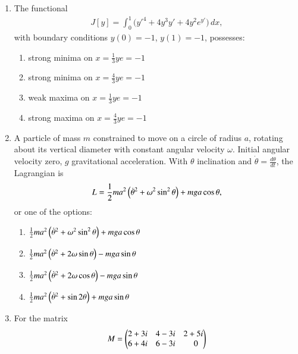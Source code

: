 \documentclass[journal]{IEEEtran}
\numberwithin{equation}{enumi}
\numberwithin{figure}{enumi}
\begin{document}
\begin{enumerate}
\item
The functional
\begin{align}
J[y] = \int_0^1 \Big( y'^4 + 4 y^3 y' + 4 y^2 e^{y'} \Big) \, dx,
\end{align}
with boundary conditions $y(0) = -1$, $y(1) = -1$, possesses:
\hfill{}
\begin{multicols}{2}
\begin{enumerate}
\item strong minima on $x = \frac{1}{3} y e = -1$
\item strong minima on $x = \frac{4}{3} y e = -1$
\item weak maxima on $x = \frac{1}{3} y e = -1$
\item strong maxima on $x = \frac{4}{3} y e = -1$
\end{enumerate}
\end{multicols}

\item
A particle of mass $m$ constrained to move on a circle of radius $a$, rotating about its vertical diameter with constant angular velocity $\omega$. Initial angular velocity zero, $g$ gravitational acceleration. With $\theta$ inclination and $\dot{\theta} = \frac{d\theta}{dt}$, the Lagrangian is
\begin{align}
L = \frac{1}{2} m a^2 \left(\dot{\theta}^2 + \omega^2 \sin^2 \theta\right) + m g a \cos \theta,
\end{align}
or one of the options:
\hfill{}
\begin{multicols}{2}
\begin{enumerate}
\item $\frac{1}{2} m a^2 \left(\dot{\theta}^2 + \omega^2 \sin^2 \theta\right) + m g a \cos \theta$
\item $\frac{1}{2} m a^2 \left(\dot{\theta}^2 + 2 \omega \sin \theta\right) - m g a \sin \theta$
\item $\frac{1}{2} m a^2 \left(\dot{\theta}^2 + 2 \omega \cos \theta\right) - m g a \sin \theta$
\item $\frac{1}{2} m a^2 \left(\dot{\theta}^2 + \sin 2\theta\right) + m g a \sin \theta$
\end{enumerate}
\end{multicols}

\item
For the matrix
\begin{align}
    M = \begin{pmatrix}
2+3i & 4 - 3i & 2 + 5i \\
6 + 4i & 6 - 3i & \phantom{-}0
\end{pmatrix}
\end{align}



\end{enumerate}
\end{document}
